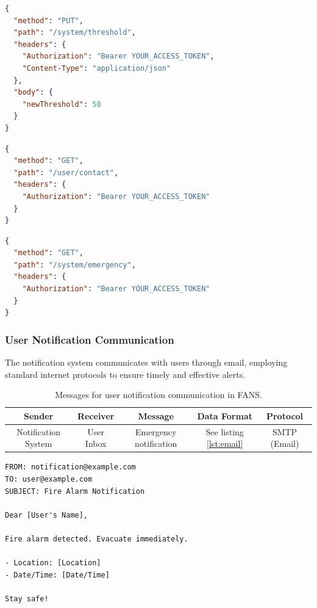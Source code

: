 \begin{lstlisting}[language=json,label={lst:threshold},caption={Threshold update message.}]
{
  "method": "PUT",
  "path": "/system/threshold",
  "headers": {
    "Authorization": "Bearer YOUR_ACCESS_TOKEN",
    "Content-Type": "application/json"
  },
  "body": {
    "newThreshold": 50
  }
}
\end{lstlisting}

\begin{lstlisting}[language=json,label={lst:contact},caption={Request for user contact information.}]
{
  "method": "GET",
  "path": "/user/contact",
  "headers": {
    "Authorization": "Bearer YOUR_ACCESS_TOKEN"
  }
}
\end{lstlisting}

\begin{lstlisting}[language=json,label={lst:emergency},caption={Request for emergency flag.}]
{
  "method": "GET",
  "path": "/system/emergency",
  "headers": {
    "Authorization": "Bearer YOUR_ACCESS_TOKEN"
  }
}
\end{lstlisting}

\subsubsection{User Notification Communication}

The notification system communicates with users through email, employing standard internet protocols to ensure timely
and effective alerts.

\begin{table}[H]
    \centering
    \begin{tabular}{| c | c | c | c | c |}
        \hline
        Sender              & Receiver   & Message                & Data Format                 & Protocol     \\
        \hline
        Notification System & User Inbox & Emergency notification & See listing \ref{lst:email} & SMTP (Email) \\
        \hline
    \end{tabular}
    \caption{Messages for user notification communication in FANS.}
\end{table}

\begin{lstlisting}[label={lst:email},caption={Email notification for detected emergency in FANS.}]
FROM: notification@example.com
TO: user@example.com
SUBJECT: Fire Alarm Notification

Dear [User's Name],

Fire alarm detected. Evacuate immediately.

- Location: [Location]
- Date/Time: [Date/Time]

Stay safe!
\end{lstlisting}

